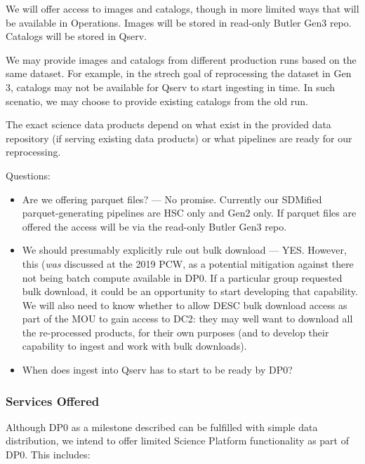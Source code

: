 We will offer access to images and catalogs, though in more limited ways that will be available in Operations.
Images will be stored in read-only Butler Gen3 repo.
Catalogs will be stored in Qserv.

We may provide images and catalogs from different production runs based on the same dataset.
For example, in the strech goal of reprocessing the dataset in Gen 3, catalogs may not be available for Qserv to start ingesting in time. In such scenatio, we may choose to provide existing catalogs from the old run.

The exact science data products depend on what exist in the provided data repository (if serving existing data products) or what pipelines are ready for our reprocessing.

Questions:

\begin{itemize}

\item Are we offering parquet files? --- No promise. Currently our SDMified parquet-generating pipelines are HSC only and Gen2 only. If parquet files are offered the access will be via the read-only Butler Gen3 repo.

\item We should presumably explicitly rule out bulk download  --- YES. However, this ({\it was} discussed at the 2019 PCW, as a potential mitigation against there not being batch compute available in DP0. If a particular group requested bulk download, it could be an opportunity to start developing that capability. We will also need to know whether to allow DESC bulk download access as part of the MOU to gain access to DC2: they may well want to download all the re-processed products, for their own purposes (and to develop their capability to ingest and work with bulk downloads).

\item When does ingest into Qserv has to start to be ready by DP0?

\end{itemize}

\subsubsection{Services Offered}

Although DP0 as a milestone described  can be fulfilled with simple data distribution, we intend to offer limited Science Platform functionality as part of DP0. This includes:


